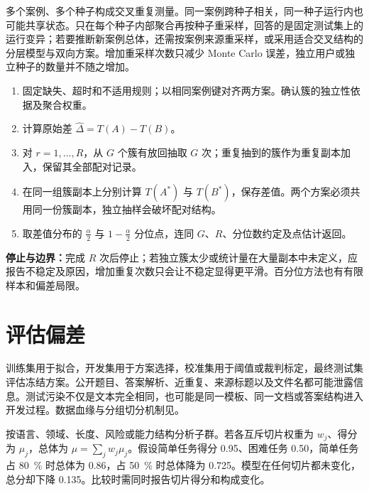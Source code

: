 \documentclass[../textbook.tex]{subfiles}
\begin{document}
多个案例、多个种子构成交叉重复测量。同一案例跨种子相关，同一种子运行内也可能共享状态。只在每个种子内部聚合再按种子重采样，回答的是固定测试集上的运行变异；若要推断新案例总体，还需按案例来源重采样，或采用适合交叉结构的分层模型与双向方案。增加重采样次数只减少 Monte Carlo 误差，独立用户或独立种子的数量并不随之增加。

\begin{algorithm}[配对簇重采样区间]
\begin{enumerate}
 \item 固定缺失、超时和不适用规则；以相同案例键对齐两方案。确认簇的独立性依据及聚合权重。
 \item 计算原始差 $\hat\Delta=T(A)-T(B)$。
 \item 对 $r=1,\ldots,R$，从 $G$ 个簇有放回抽取 $G$ 次；重复抽到的簇作为重复副本加入，保留其全部配对记录。
 \item 在同一组簇副本上分别计算 $T(A^*)$ 与 $T(B^*)$，保存差值。两个方案必须共用同一份簇副本，独立抽样会破坏配对结构。
 \item 取差值分布的 $\frac{\alpha}{2}$ 与 $1-\frac{\alpha}{2}$ 分位点，连同 $G$、$R$、分位数约定及点估计返回。
\end{enumerate}
\textbf{停止与边界：}完成 $R$ 次后停止；若独立簇太少或统计量在大量副本中未定义，应报告不稳定及原因，增加重复次数只会让不稳定显得更平滑。百分位方法也有有限样本和偏差局限。
\end{algorithm}

\section{评估偏差}

训练集用于拟合，开发集用于方案选择，校准集用于阈值或裁判标定，最终测试集评估冻结方案。公开题目、答案解析、近重复、来源标题以及文件名都可能泄露信息。测试污染不仅是文本完全相同，也可能是同一模板、同一文档或答案结构进入开发过程。数据血缘与分组切分机制见。

按语言、领域、长度、风险或能力结构分析子群。若各互斥切片权重为 $w_j$、得分为 $\mu_j$，总体为 $\mu=\sum_jw_j\mu_j$。假设简单任务得分 0.95、困难任务 0.50，简单任务占 \qty{80}{\percent} 时总体为 0.86，占 \qty{50}{\percent} 时总体降为 0.725。模型在任何切片都未变化，总分却下降 0.135。比较时需同时报告切片得分和构成变化。
\end{document}
